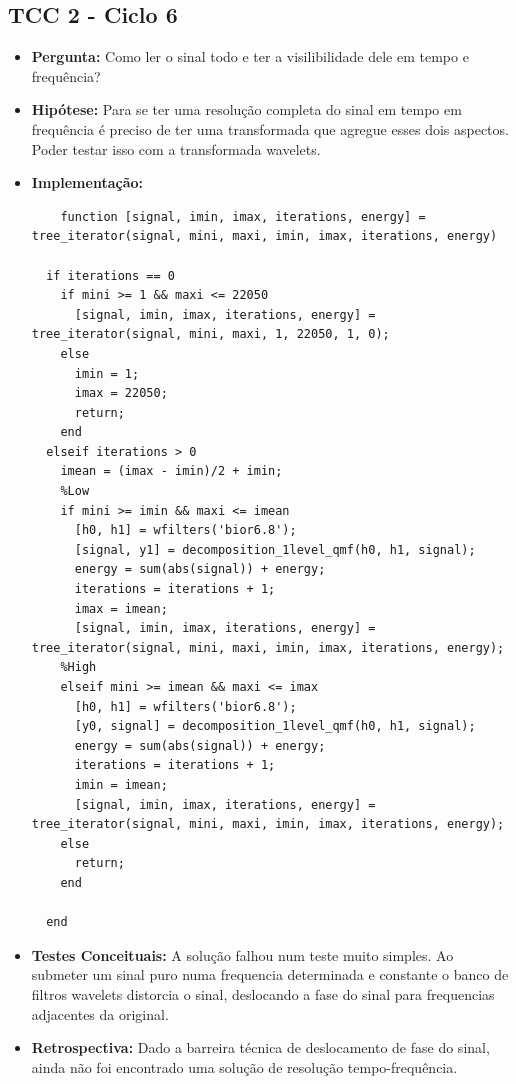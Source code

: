 \subsection{TCC 2 - Ciclo 6}
\begin{itemize}
\item \textbf{Pergunta:} Como ler o sinal todo e ter a visilibilidade dele em tempo e frequência?
\item \textbf{Hipótese:} Para se ter uma resolução completa do sinal em tempo em frequência é preciso de ter uma transformada que agregue esses dois aspectos. Poder testar isso com a transformada wavelets.   
\item \textbf{Implementação:} 
\begin{lstlisting}
    function [signal, imin, imax, iterations, energy] = tree_iterator(signal, mini, maxi, imin, imax, iterations, energy)

  if iterations == 0
    if mini >= 1 && maxi <= 22050
      [signal, imin, imax, iterations, energy] = tree_iterator(signal, mini, maxi, 1, 22050, 1, 0);
    else
      imin = 1;
      imax = 22050;
      return;
    end
  elseif iterations > 0
    imean = (imax - imin)/2 + imin;
    %Low
    if mini >= imin && maxi <= imean
      [h0, h1] = wfilters('bior6.8');
      [signal, y1] = decomposition_1level_qmf(h0, h1, signal);
      energy = sum(abs(signal)) + energy;
      iterations = iterations + 1;
      imax = imean;
      [signal, imin, imax, iterations, energy] = tree_iterator(signal, mini, maxi, imin, imax, iterations, energy);
    %High 
    elseif mini >= imean && maxi <= imax
      [h0, h1] = wfilters('bior6.8');
      [y0, signal] = decomposition_1level_qmf(h0, h1, signal);
      energy = sum(abs(signal)) + energy;
      iterations = iterations + 1;
      imin = imean;
      [signal, imin, imax, iterations, energy] = tree_iterator(signal, mini, maxi, imin, imax, iterations, energy);
    else
      return;
    end

  end

\end{lstlisting}
\item \textbf{Testes Conceituais:} A solução falhou num teste muito simples. Ao submeter um sinal puro numa frequencia determinada e constante o banco de filtros wavelets distorcia o sinal, deslocando a fase do sinal para frequencias adjacentes da original.
\item \textbf{Retrospectiva:} Dado a barreira técnica de deslocamento de fase do sinal, ainda não foi encontrado uma solução de resolução tempo-frequência.
\end{itemize}

